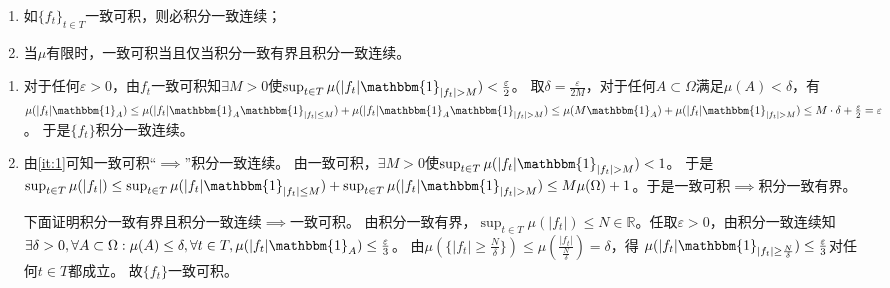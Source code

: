 \documentclass{ctexart}
\begin{document}
\begin{problem}\label{pro:3.6.26}
  \begin{enumerate}
    \item 如\(\{f_t\}_{t \in T} \)一致可积，则必积分一致连续；
    \item 当\(\mu \)有限时，一致可积当且仅当积分一致有界且积分一致连续。
  \end{enumerate}
\end{problem}
\begin{solution}
  \begin{enumerate}
    \item \label{it:1}对于任何\(\varepsilon>0 \)，由\(f_t \)一致可积知\(\exists M>0 \)使\(\sup_{t \in T} \mu(|f_t| \mathbbm{1}_{|f_t|>M})<\frac{\varepsilon}{2} \)。
      取\(\delta=\frac{\varepsilon}{2M} \)，对于任何\(A \subset \Omega \)满足\(\mu(A)<\delta \)，有\(\mu(|f_t|\mathbbm{1}_A) \leq \mu(|f_t|\mathbbm{1}_A \mathbbm{1}_{|f_t| \leq M}) +\mu (|f_t|\mathbbm{1}_A \mathbbm{1}_{|f_t| > M})
        \leq \mu(M\mathbbm{1}_A) + \mu(|f_t|\mathbbm{1}_{|f_t|>M}) \leq M \cdot \delta + \frac{\varepsilon}{2}=\varepsilon
      \)。
      于是\(\{f_t\} \)积分一致连续。
    \item 由\ref{it:1}可知一致可积``\(\implies\)''积分一致连续。
      由一致可积，\(\exists M>0 \)使\(\sup_{t \in T} \mu(|f_t| \mathbbm{1}_{|f_t|>M})<1 \)。
      于是\(\sup_{t \in T} \mu(|f_t|) \leq \sup_{t \in T} \mu(|f_t|\mathbbm{1}_{|f_t| \leq M}) + \sup_{t \in T}\mu(|f_t|\mathbbm{1}_{|f_t|>M})
      \leq M \mu(\Omega) + 1\)。于是一致可积\(\implies\)积分一致有界。

      下面证明积分一致有界且积分一致连续\(\implies\)一致可积。
      由积分一致有界，\(\sup_{t \in T} \mu(|f_t|) \leq N \in \mathbb{R} \)。任取\(\varepsilon >0 \)，由积分一致连续知\(\exists \delta>0,\forall A \subset \Omega:\mu(A)\leq \delta,\forall t \in T,\mu(|f_t|\mathbbm{1}_{A}) \leq \frac{\varepsilon}{3} \)。
      由\(\mu(\{|f_t| \geq \frac{N}{\delta}\}) \leq \mu(\frac{|f_t|}{\frac{N}{\delta}})=\delta \)，得 \(\mu(|f_t|\mathbbm{1}_{|f_t| \geq \frac{N}{\delta}}) \leq \frac{\varepsilon}{3} \)对任何\(t \in T \)都成立。
      故\(\{f_t\} \)一致可积。
  \end{enumerate}
\end{solution}
\end{document}
